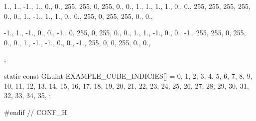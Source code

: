 \documentclass[14pt,a4paper]{extarticle}
\theoremstyle{definition}
\renewcommand{\[}{\begin{singlespace}\begin{equation*}}
\renewcommand{\]}{\end{equation*}\end{singlespace}}
\begin{document}
\begin{multicols}{2}
\begin{ccode}
{    {{ 1.,  1., -1.}, { 1.,  0.,  0.}, {255, 255,   0, 255}, {0., 0.}},
    {{ 1.,  1.,  1.}, { 1.,  0.,  0.}, {255, 255, 255, 255}, {0., 0.}},
    {{ 1., -1.,  1.}, { 1.,  0.,  0.}, {255,   0, 255, 255}, {0., 0.}},

    {{-1.,  1., -1.}, { 0.,  0., -1.}, {  0, 255,   0, 255}, {0., 0.}},
    {{ 1.,  1., -1.}, { 0.,  0., -1.}, {255, 255,   0, 255}, {0., 0.}},
    {{ 1., -1., -1.}, { 0.,  0., -1.}, {255,   0,   0, 255}, {0., 0.}},
};

static const GLuint EXAMPLE_CUBE_INDICIES[] = {
     0,  1,  2,  3,  4,  5,  6,  7,  8,  9, 10, 11,
    12, 13, 14, 15, 16, 17, 18, 19, 20, 21, 22, 23,
    24, 25, 26, 27, 28, 29, 30, 31, 32, 33, 34, 35,
};

#endif // CONF_H
\end{ccode}
\end{multicols}
\end{document}
